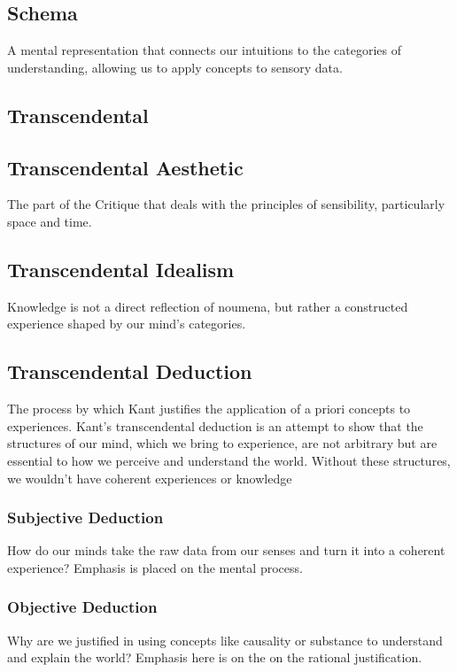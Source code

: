\documentclass[a4paper]{article}
\begin{document}
\subsection{Schema}
A mental representation that connects our intuitions to the categories of understanding, allowing us to apply concepts to sensory data.

\subsection{Transcendental}

\subsection{Transcendental Aesthetic}
The part of the Critique that deals with the principles of sensibility, particularly space and time.

\subsection{Transcendental Idealism}
Knowledge is not a direct reflection of noumena, but rather a constructed experience shaped by our mind's categories.

\subsection{Transcendental Deduction}
The process by which Kant justifies the application of a priori concepts to experiences.
Kant's transcendental deduction is an attempt to show that the structures of our mind, which we bring to experience, are not arbitrary but are essential to how we perceive and understand the world. 
Without these structures, we wouldn't have coherent experiences or knowledge

\subsubsection{Subjective Deduction}
How do our minds take the raw data from our senses and turn it into a coherent experience? 
Emphasis is placed on the mental process.

\subsubsection{Objective Deduction}
Why are we justified in using concepts like causality or substance to understand and explain the world? 
Emphasis here is on the on the rational justification.
\end{document}
